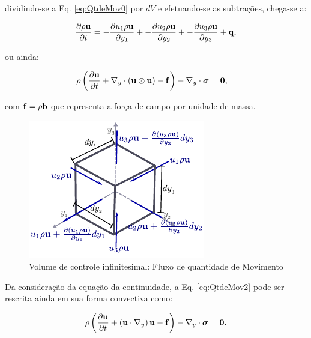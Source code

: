 \documentclass[tese_patricia]{subfiles}%
\begin{document}
\noindent dividindo-se a Eq. \ref{eq:QtdeMov0} por $dV$ e efetuando-se as subtrações, chega-se a:

\begin{align}
		\frac{\partial \rho \mathbf{u}}{\partial t} = 
		-\frac{\partial u_1 \rho \mathbf{u}}{\partial y_1} +
		-\frac{\partial u_2 \rho \mathbf{u}}{\partial y_2} + 
		-\frac{\partial u_3 \rho \mathbf{u}}{\partial y_3} + \mathbf{q},
		\label{eq:QtdeMov1} 
\end{align}

ou ainda:

\begin{align}
	\rho\left(\frac{\partial\mathbf{u}}{\partial t} + \nabla_y \cdot \left(\mathbf{u}\otimes\mathbf{u}\right) - \mathbf{f} \right) - \nabla_y \cdot \boldsymbol{\sigma}  &= \mathbf{0}, \label{eq:QtdeMov2} 
\end{align}

\noindent com $\mathbf{f} = \rho \mathbf{b}$ que representa a força de campo por unidade de massa.

\begin{figure}[htb!]
	\centering 
	\includegraphics[scale=1.5,trim=0cm 0.0cm 0cm 0.0cm, clip=true]{Imagens/Cap2/conserQtdeMov.pdf}	
	\caption{Volume de controle infinitesimal: Fluxo de quantidade de Movimento}
	\label{fig:VolInfiQtdeMov}
\end{figure}

Da consideração da equação da continuidade, a Eq. \ref{eq:QtdeMov2} pode ser rescrita ainda em sua forma convectiva como:

\begin{align}
	\rho\left(\frac{\partial\mathbf{u}}{\partial t} + \left( \mathbf{u} \cdot \nabla_y \right)  \mathbf{u}  - \mathbf{f} \right) - \nabla_y \cdot \boldsymbol{\sigma} = \mathbf{0}. \label{eq:Navier-Stokes} 
\end{align}
\end{document}
